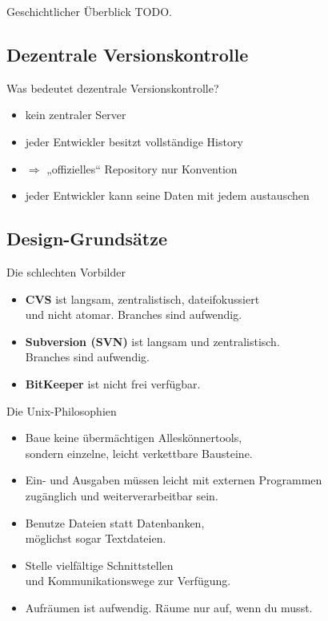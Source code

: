 \begin{frame}{Geschichtlicher Überblick}
TODO.
\end{frame}

\subsection{Dezentrale Versionskontrolle}

\begin{frame}{Was bedeutet dezentrale Versionskontrolle?}
\begin{itemize}
	\item kein zentraler Server
	\item jeder Entwickler besitzt vollständige History
	\item $\Rightarrow$ „offizielles“ Repository nur Konvention
	\item jeder Entwickler kann seine Daten mit jedem austauschen
\end{itemize}
\end{frame}

\subsection{Design-Grundsätze}

\begin{frame}{Die schlechten Vorbilder}
\begin{itemize}
	\item \textbf{CVS} ist langsam, zentralistisch, dateifokussiert\\und nicht atomar. Branches sind aufwendig.
	\item \textbf{Subversion (SVN)} ist langsam und zentralistisch.\\Branches sind aufwendig.
	\item \textbf{BitKeeper} ist nicht frei verfügbar.
\end{itemize}
\end{frame}

\begin{frame}{Die Unix-Philosophien}
\begin{itemize}
	\item Baue keine übermächtigen Alleskönnertools,\\sondern einzelne, leicht verkettbare Bausteine.
	\item Ein- und Ausgaben müssen leicht mit externen Programmen\\zugänglich und weiterverarbeitbar sein.
	\item Benutze Dateien statt Datenbanken,\\möglichst sogar Textdateien.
	\item Stelle vielfältige Schnittstellen\\und Kommunikationswege zur Verfügung.
	\item Aufräumen ist aufwendig. Räume nur auf, wenn du musst.
\end{itemize}
\end{frame}

